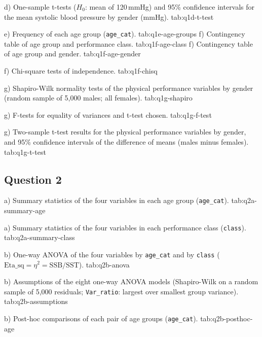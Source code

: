   {d) One-sample t-tests ($H_0$: mean of 120\,mmHg) and 95\% confidence intervals for the mean systolic blood pressure by gender (mmHg).}
  {tab:q1d-t-test}

  {e) Frequency of each age group (\texttt{age\_cat}).}
  {tab:q1e-age-groups}
  {f) Contingency table of age group and performance class.}
  {tab:q1f-age-class}
  {f) Contingency table of age group and gender.}
  {tab:q1f-age-gender}

  {f) Chi-square tests of independence.}
  {tab:q1f-chisq}

  {g) Shapiro-Wilk normality tests of the physical performance variables by gender (random sample of 5,000 males; all females).}
  {tab:q1g-shapiro}

  {g) F-tests for equality of variances and t-test chosen.}
  {tab:q1g-f-test}

  {g) Two-sample t-test results for the physical performance variables by gender, and 95\% confidence intervals of the difference of means (males minus females).}
  {tab:q1g-t-test}
  
\clearpage
\subsection{Question 2}

  {a) Summary statistics of the four variables in each age group (\texttt{age\_cat}).}
  {tab:q2a-summary-age}

  {a) Summary statistics of the four variables in each performance class (\texttt{class}).}
  {tab:q2a-summary-class}

  {b) One-way ANOVA of the four variables by \texttt{age\_cat} and by \texttt{class} ($\mathrm{Eta\_sq} = \eta^2 = \mathrm{SSB}/\mathrm{SST}$).}
  {tab:q2b-anova}

  {b) Assumptions of the eight one-way ANOVA models (Shapiro-Wilk on a random sample of 5,000 residuals; \texttt{Var\_ratio}: largest over smallest group variance).}
  {tab:q2b-assumptions}

  {b) Post-hoc comparisons of each pair of age groups (\texttt{age\_cat}).}
  {tab:q2b-posthoc-age}

